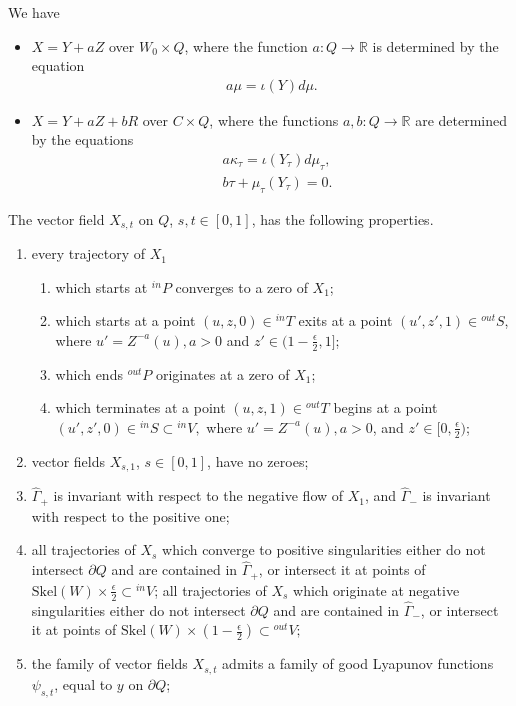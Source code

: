 \documentclass[10pt,a4paper]{amsart}
\newcommand{\R}{\mathbb{R}}
\newcommand{\Skel}{\mathrm{Skel}}
\newcommand{\eps}{\epsilon}
\newcommand{\p}{\partial}
\newcommand{\wh}{\widehat}
\begin{document}
 \begin{lemma}\label{lm:widehatX}
 We have 
\begin{itemize}
\item[1.] $X= Y+aZ$ over $W_0\times Q$, where the function $a:Q\to\R$ is determined by the equation 
\begin{align}\label{eq:function-a1}
a\mu=\iota(Y)d\mu.
\end{align}
\item[2.] $X=Y+aZ+bR$ over $C\times Q$, where the functions
  $a,b:Q\to\R$ are determined  by the equations
  \begin{equation}\label{lm:widehatX2}
  \begin{split}
 & a\kappa_\tau=\iota(Y_\tau)d\mu_\tau, \\
 & b\tau+\mu_\tau(Y_\tau)=0.
 \end{split}
 \end{equation}
 \end{itemize}
 \end{lemma}

\begin{prop}\label{prop:prelim-plug}
 The vector field   $X_{s,t}$ on $Q$, $s,t \in[0,1] $, has the following properties.  
\begin{enumerate}
 
\item  every trajectory of $X_{1}$
\begin{enumerate}
\item  which starts  at
 ${}^{in}P  $ converges to a zero of $X_{1}$;

 \item  which starts  at a point $(u,z,0) \in {}^{in}T$    exits   at a point $(u',z',1)\in {}^{out}S   $,   where  $u'=Z^{-a}(u) , a>0$  and  $z'\in(1-\frac\eps2,1]$;  
\item   which ends 
 ${}^{out}P $ originates at a zero of $X_{1}$;
 \item which terminates  at a point $(u,z,1) \in {}^{out}T $ begins at   a point $(u',z',0)  \in {}^{in}S \subset {}^{in}V, $  where  $u'=Z^{-a}(u) , a>0$, and  $z'\in[0,\frac\eps2)$;  
\end{enumerate}
 
\item  vector fields $X_{s,1}$, $s\in[0,1] $, have no zeroes;
\item $\wh\Gamma_+$ is invariant with respect to the negative flow of $X_1$, and $\wh\Gamma_-$ is invariant with respect to the positive one;
\item all trajectories of $X_s$ which converge to positive singularities either do not intersect $\p Q$ and are contained in $\wh\Gamma_+$, or intersect it at points of $\Skel(W)\times\frac\eps2\subset {}^{in}V$; all trajectories of $X_s$ which originate at negative singularities either do not intersect $\p Q$ and are contained in $\wh \Gamma_-$, or intersect it at points of $\Skel(W)\times(1-\frac{\eps}2)\subset {}^{out}V;$
\item  the  family of vector fields $X_{s,t}$ admits a family of good Lyapunov functions $ \psi_{s,t}$, equal to $y$ on $\p Q$;
\end{enumerate}
\end{prop}  
\end{document}

